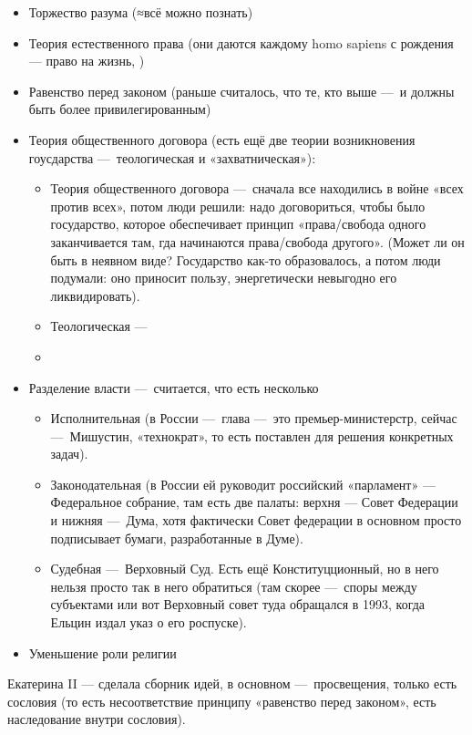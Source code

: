 \documentclass[12pt, a4paper]{article}
\begin{document}
\begin{itemize}
    \item Торжество разума (≈всё можно познать)
    \item Теория естественного права (они даются каждому homo sapiens с рождения — право на жизнь, )
    \item Равенство перед законом (раньше считалось, что те, кто выше — и должны быть более привилегированным)
    \item Теория общественного договора (есть ещё две теории возникновения гоусдарства — теологическая и «захватническая»):
    \begin{itemize}
        \item Теория общественного договора — сначала все находились в войне «всех против всех», потом люди решили: надо договориться, чтобы было государство, которое обеспечивает принцип «права/свобода одного заканчивается там, гда начинаются права/свобода другого». 
        (Может ли он быть в неявном виде?  Государство как-то образовалось, а потом люди подумали: оно приносит пользу, энергетически невыгодно его ликвидировать).
        \item Теологическая — 
        \item 
    \end{itemize}
    \item Разделение власти — считается, что есть несколько
    \begin{itemize}
        \item Исполнительная (в России — глава — это премьер-министерстр, сейчас — Мишустин, «технократ», то есть поставлен для решения конкретных задач). 
        \item Законодательная (в России ей руководит российский «парламент» — Федеральное собрание, там есть две палаты: верхня — Совет Федерации и нижняя — Дума, хотя фактически Совет федерации в основном просто подписывает бумаги, разработанные в Думе).
        \item Судебная — Верховный Суд. Есть ещё Конституцционный, но в него нельзя просто так в него обратиться (там скорее — споры между субъектами или вот Верховный совет туда обращался в 1993, когда Ельцин издал указ о его роспуске).
    \end{itemize}
    \item Уменьшение роли религии
\end{itemize}

Екатерина II — сделала сборник идей, в основном — просвещения, только есть сословия (то есть несоответствие принципу «равенство перед законом», есть наследование внутри сословия).
\end{document}

